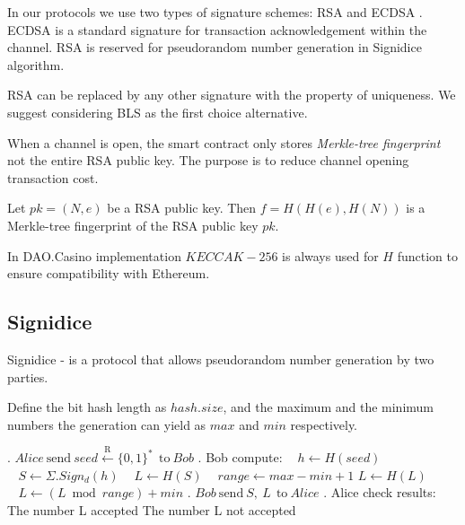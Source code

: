 In our protocols we use two types of signature schemes: RSA \cite{bib19} and ECDSA \cite{bib20}. ECDSA is a standard signature for transaction acknowledgement within the channel. RSA is reserved for pseudorandom number generation in Signidice algorithm.

\begin{remark}
RSA can be replaced by any other signature with the property of uniqueness. We suggest considering BLS \cite{bib10} as the first choice alternative.
\end{remark}

When a channel is open, the smart contract only stores \textit {Merkle-tree fingerprint} not the entire RSA public key. The purpose is to reduce channel opening transaction cost.

\begin{defn}
Let $pk = (N, e)$ be a RSA public key. Then $f = H(H(e), H(N))$ is a Merkle-tree fingerprint of the RSA public key $pk$. 
\end{defn}
\begin{remark}
In DAO.Casino implementation $KECCAK-256$ \cite{bib21} is always used for $H$ function to ensure compatibility with Ethereum. 
\end{remark}

	\subsection{Signidice}

Signidice \cite{bib18} - is a protocol that allows pseudorandom number generation by two parties. 

Define the bit hash length as $hash.size$, and the maximum and the minimum numbers the generation can yield as $max$ and $ min$ respectively.

\begin{algorithm} 
\caption*{$\textbf{Signidice}$} \label{alg:signidice}
\begin{algorithmic}
. $ Alice \ \text{send}\  seed\xleftarrow{\text{R}} \{0,1\}^* \  \ \text{to} \ Bob$
. Bob compute:
\State $\ \ \ \ h \gets H(seed)$
\State $\ \ \ \ S \gets  \Sigma . Sign_d(h)$
\State $\ \ \ \ L \gets H(S) $
\State $\ \ \ \ range \gets max - min +1$
\State$ L \gets H(L)$
\EndWhile
\State $ \ \ \ \  L \gets (L \bmod range) + min $
. $Bob \ \text{send}\  S, \ L \ \   \text{to} \ Alice$
. Alice check results:
\State The number L accepted
\Else 
\State The number L not accepted
\EndIf
\end{algorithmic}
\end{algorithm}

